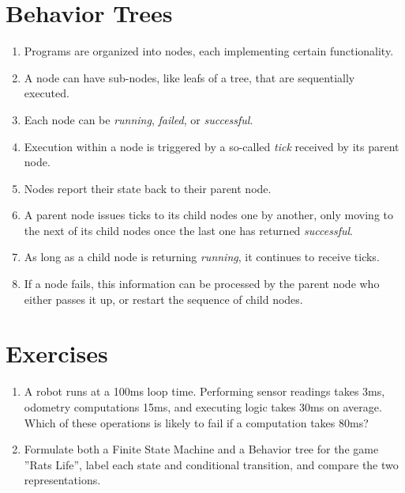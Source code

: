 \section{Behavior Trees}
\begin{enumerate}
\item Programs are organized into nodes, each implementing certain functionality.
\item A node can have sub-nodes, like leafs of a tree, that are sequentially executed.
\item Each node can be \emph{running}, \emph{failed}, or \emph{successful}.
\item Execution within a node is triggered by a so-called \emph{tick} received by its parent node.
\item Nodes report their state back to their parent node.
\item A parent node issues ticks to its child nodes one by another, only moving to the next of its child nodes once the last one has returned \emph{successful}.
\item As long as a child node is returning \emph{running}, it continues to receive ticks.
\item If a node fails, this information can be processed by the parent node who either passes it up, or restart the sequence of child nodes.
\end{enumerate}

\section{Exercises}

\begin{enumerate}
\item A robot runs at a 100ms loop time. Performing sensor readings takes 3ms, odometry computations 15ms, and executing logic takes 30ms on average. Which of these operations is likely to fail if a computation takes 80ms?
\item Formulate both a Finite State Machine and a Behavior tree for the game ''Rats Life'', label each state and conditional transition, and compare the two representations.
\end{enumerate}